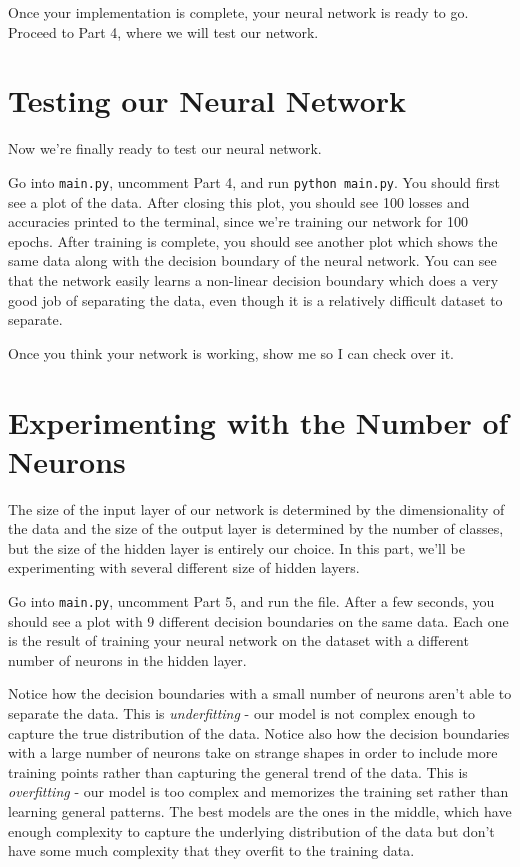 \documentclass{article}
\begin{document}
Once your implementation is complete, your neural network is ready to go. Proceed to Part 4, where we will test our network.

\section{Testing our Neural Network}

Now we're finally ready to test our neural network.

Go into \texttt{main.py}, uncomment Part 4, and run \texttt{python main.py}. You should first see a plot of the data. After closing this plot, you should see 100 losses and accuracies printed to the terminal, since we're training our network for 100 epochs. After training is complete, you should see another plot which shows the same data along with the decision boundary of the neural network. You can see that the network easily learns a non-linear decision boundary which does a very good job of separating the data, even though it is a relatively difficult dataset to separate.

Once you think your network is working, show me so I can check over it.

\section{Experimenting with the Number of Neurons}

The size of the input layer of our network is determined by the dimensionality of the data and the size of the output layer is determined by the number of classes, but the size of the hidden layer is entirely our choice. In this part, we'll be experimenting with several different size of hidden layers.

Go into \texttt{main.py}, uncomment Part 5, and run the file. After a few seconds, you should see a plot with 9 different decision boundaries on the same data. Each one is the result of training your neural network on the dataset with a different number of neurons in the hidden layer.

Notice how the decision boundaries with a small number of neurons aren't able to separate the data. This is \textit{underfitting} - our model is not complex enough to capture the true distribution of the data. Notice also how the decision boundaries with a large number of neurons take on strange shapes in order to include more training points rather than capturing the general trend of the data. This is \textit{overfitting} - our model is too complex and memorizes the training set rather than learning general patterns. The best models are the ones in the middle, which have enough complexity to capture the underlying distribution of the data but don't have some much complexity that they overfit to the training data.
\end{document}
